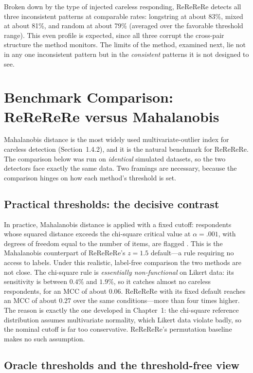 Broken down by the type of injected careless responding, ReReReRe detects all
three inconsistent patterns at comparable rates: longstring at about 83\%, mixed
at about 81\%, and random at about 79\% (averaged over the favorable threshold
range). This even profile is expected, since all three corrupt the cross-pair
structure the method monitors. The limits of the method, examined next, lie not
in any one inconsistent pattern but in the \emph{consistent} patterns it is not
designed to see.

\section{Benchmark Comparison: ReReReRe versus Mahalanobis}

Mahalanobis distance is the most widely used multivariate-outlier index for
careless detection (Section~1.4.2), and it is the natural benchmark for
ReReReRe. The comparison below was run on \emph{identical} simulated datasets, so
the two detectors face exactly the same data. Two framings are necessary,
because the comparison hinges on how each method's threshold is set.

\subsection{Practical thresholds: the decisive contrast}

In practice, Mahalanobis distance is applied with a fixed cutoff: respondents
whose squared distance exceeds the chi-square critical value at $\alpha = .001$,
with degrees of freedom equal to the number of items, are flagged
\parencite{meade2012identifying, curran2016methods}. This is the Mahalanobis
counterpart of ReReReRe's $z = 1.5$ default---a rule requiring no access to
labels. Under this realistic, label-free comparison the two methods are not
close. The chi-square rule is \emph{essentially non-functional} on Likert data:
its sensitivity is between $0.4\%$ and $1.9\%$, so it catches almost no careless
respondents, for an MCC of about $0.06$. ReReReRe with its fixed default reaches
an MCC of about $0.27$ over the same conditions---more than four times higher.
The reason is exactly the one developed in Chapter~1: the chi-square reference
distribution assumes multivariate normality, which Likert data violate badly, so
the nominal cutoff is far too conservative. ReReReRe's permutation baseline makes
no such assumption.

\subsection{Oracle thresholds and the threshold-free view}

